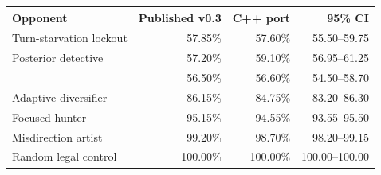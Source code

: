\begin{tabular}{lrrr}
\toprule
Opponent & Published v0.3 & C++ port & 95\% CI \\
\midrule
Turn-starvation lockout & 57.85\% & 57.60\% & 55.50--59.75 \\
Posterior detective & 57.20\% & 59.10\% & 56.95--61.25 \\
\vtwo{} & 56.50\% & 56.60\% & 54.50--58.70 \\
Adaptive diversifier & 86.15\% & 84.75\% & 83.20--86.30 \\
Focused hunter & 95.15\% & 94.55\% & 93.55--95.50 \\
Misdirection artist & 99.20\% & 98.70\% & 98.20--99.15 \\
Random legal control & 100.00\% & 100.00\% & 100.00--100.00 \\
\bottomrule
\end{tabular}
